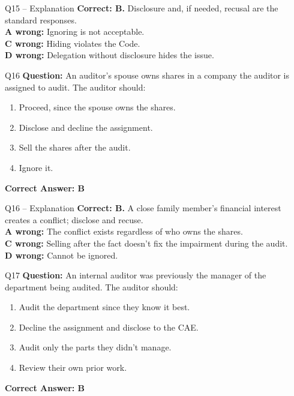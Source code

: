 \documentclass[aspectratio=169,10pt]{beamer}
\begin{document}
	\begin{frame}[t]{Q15 -- Explanation}
		\small
		\textbf{Correct: B.} Disclosure and, if needed, recusal are the standard responses. \\[4pt]
		\textbf{A wrong:} Ignoring is not acceptable. \\[2pt]
		\textbf{C wrong:} Hiding violates the Code. \\[2pt]
		\textbf{D wrong:} Delegation without disclosure hides the issue.
	\end{frame}
	
	\begin{frame}[t]{Q16}
		\small
		\textbf{Question:} An auditor's spouse owns shares in a company the auditor is assigned to audit. The auditor should:
		\begin{enumerate}[label=\Alph*.,itemsep=1pt,topsep=2pt]
			\item Proceed, since the spouse owns the shares.
			\item Disclose and decline the assignment.
			\item Sell the shares after the audit.
			\item Ignore it.
		\end{enumerate}
		\vspace{4pt}
		\textbf{Correct Answer: B}
	\end{frame}
	
	\begin{frame}[t]{Q16 -- Explanation}
		\small
		\textbf{Correct: B.} A close family member's financial interest creates a conflict; disclose and recuse. \\[4pt]
		\textbf{A wrong:} The conflict exists regardless of who owns the shares. \\[2pt]
		\textbf{C wrong:} Selling after the fact doesn't fix the impairment during the audit. \\[2pt]
		\textbf{D wrong:} Cannot be ignored.
	\end{frame}
	
	\begin{frame}[t]{Q17}
		\small
		\textbf{Question:} An internal auditor was previously the manager of the department being audited. The auditor should:
		\begin{enumerate}[label=\Alph*.,itemsep=1pt,topsep=2pt]
			\item Audit the department since they know it best.
			\item Decline the assignment and disclose to the CAE.
			\item Audit only the parts they didn't manage.
			\item Review their own prior work.
		\end{enumerate}
		\vspace{4pt}
		\textbf{Correct Answer: B}
	\end{frame}
	
\end{document}
